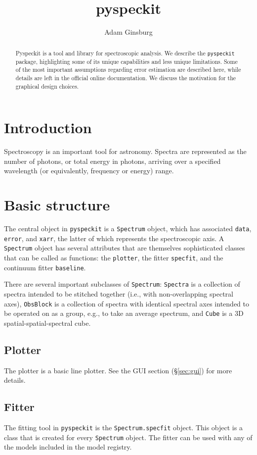 \documentclass[twocolumn]{aastex61}
\newcommand{\pyspeckit}{\texttt{pyspeckit}\xspace}
\begin{document}
\title{pyspeckit}

\author[0000-0001-6431-9633]{Adam Ginsburg}


\begin{abstract}
Pyspeckit is a tool and library for spectroscopic analysis.  We describe the
\texttt{pyspeckit} package, highlighting some of its unique capabilities and
less unique limitations.  Some of the most important assumptions regarding
error estimation are described here, while details are left in the official
online documentation.  We  discuss the motivation for the graphical design
choices.
\end{abstract}


\section{Introduction}
Spectroscopy is an important tool for astronomy.  Spectra are represented as
the number of photons, or total energy in photons, arriving over a specified
wavelength (or equivalently, frequency or energy) range.



\section{Basic structure}
The central object in \pyspeckit is a \texttt{Spectrum} object, which has
associated \texttt{data}, \texttt{error}, and \texttt{xarr}, the latter of
which represents the spectroscopic axis.  A \texttt{Spectrum} object has
several attributes that are themselves sophisticated classes that can be called
as functions: the \texttt{plotter}, the fitter \texttt{specfit}, and the
continuum fitter \texttt{baseline}.

There are several important subclasses of \texttt{Spectrum}: \texttt{Spectra}
is a collection of spectra intended to be stitched together (i.e., with
non-overlapping spectral axes), \texttt{ObsBlock} is a collection of spectra
with identical spectral axes intended to be operated on as a group, e.g., to
take an average spectrum, and \texttt{Cube} is a 3D spatial-spatial-spectral
cube.

\subsection{Plotter}
The plotter is a basic line plotter.  See the GUI section (\S \ref{sec:gui})
for more details.

\subsection{Fitter}
\label{sec:fitters}
The fitting tool in \pyspeckit is the \texttt{Spectrum.specfit} object.
This object is a class that is created for every \texttt{Spectrum} object.
The fitter can be used with any of the models included in the model
registry.
\end{document}
